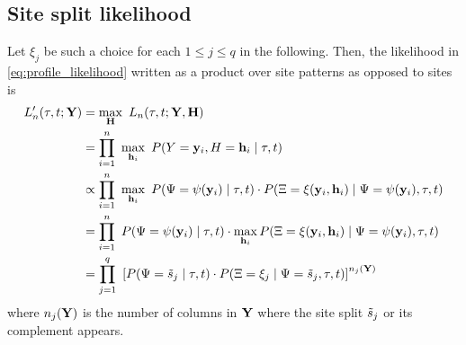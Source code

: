 \subsection*{Site split likelihood}

Let $\xi_j$ be such a choice for each $1 \leq j \leq q$ in the following.
Then, the likelihood in \eqref{eq:profile_likelihood} written as a product over site patterns as opposed to sites is
\begin{align}
L_\nCols'(\tau, t; \fullAlignment) &= \max_{\fullAncestralStates} \ L_\nCols(\tau, t; \fullAlignment, \fullAncestralStates) \nonumber \\
                             &= \prod_{i=1}^{\nCols} \ \max_{\ancestralStateColumn_i} \ P(\alignmentColumnRV=\alignmentColumn_i, \ancestralStateColumnRV=\ancestralStateColumn_i \mid \tau, t) \nonumber \\
                             &\propto \prod_{i=1}^{\nCols} \ \max_{\ancestralStateColumn_i} \ P(\siteSplitRV=\patternToSplit(\alignmentColumn_i) \mid \tau, t) \cdot P(\ancestralSplitRV=\ancestralToSplit(\alignmentColumn_i, \ancestralStateColumn_i) \mid \siteSplitRV=\patternToSplit(\alignmentColumn_i), \tau, t) \nonumber \\
                             &= \prod_{i=1}^{\nCols} \ P(\siteSplitRV=\patternToSplit(\alignmentColumn_i) \mid \tau, t) \cdot \max_{\ancestralStateColumn_i} P(\ancestralSplitRV=\ancestralToSplit(\alignmentColumn_i, \ancestralStateColumn_i) \mid \siteSplitRV=\patternToSplit(\alignmentColumn_i), \tau, t) \nonumber \\
                             &= \prod_{j=1}^{\nSiteSplits} \ \left[P(\siteSplitRV=\siteSplit_j \mid \tau, t)\cdot P(\ancestralSplitRV=\xi_j \mid \siteSplitRV=\siteSplit_j, \tau, t)\right] ^{\nCols_j(\fullAlignment)} \label{eq:site_pattern_likelihood}
\end{align}
where $n_j(\mathbf{Y})$ is the number of columns in $\mathbf{Y}$ where the site split $\tilde{s}_j$ or its complement appears.

